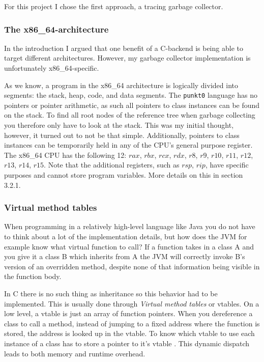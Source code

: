 For this project I chose the first approach, a tracing garbage collector.

\subsubsection{The x86\_64-architecture}
In the introduction I argued that one benefit of a C-backend is being able to target different architectures. However, my garbage collector implementation is unfortunately x86\_64-specific.

As we know, a program in the x86\_64 architecture is logically divided into segments: the stack, heap, code, and data segments. The \texttt{punkt0} language has no pointers or pointer arithmetic, as such all pointers to class instances can be found on the stack. To find all root nodes of the reference tree when garbage collecting you therefore only have to look at the stack. This was my initial thought, however, it turned out to not be that simple. Additionally, pointers to class instances can be temporarily held in any of the CPU's general purpose register. The x86\_64 CPU has the following 12: $rax$, $rbx$, $rcx$, $rdx$, $r8$, $r9$, $r10$, $r11$, $r12$, $r13$, $r14$, $r15$. Note that the additional registers, such as $rsp$, $rip$, have specific purposes and cannot store program variables. More details on this in section 3.2.1.

\subsubsection{Virtual method tables}
When programming in a relatively high-level language like Java you do not have to think about a lot of the implementation details, but how does the JVM for example know what virtual function to call? If a function takes in a class A and you give it a class B which inherits from A the JVM will correctly invoke B's version of an overridden method, despite none of that information being visible in the function body.

In C there is no such thing as inheritance so this behavior had to be implemented. This is usually done through \textit{Virtual method tables} or vtables. On a low level, a vtable is just an array of function pointers. When you dereference a class to call a method, instead of jumping to a fixed address where the function is stored, the address is looked up in the vtable. To know which vtable to use each instance of a class has to store a pointer to it's vtable \cite{vtable}. This dynamic dispatch leads to both memory and runtime overhead.

